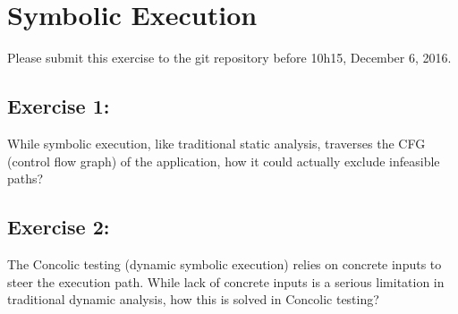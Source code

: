 \documentclass [11pt, a4wide, twoside]{article}
\begin{document}
\section*{Symbolic Execution}


Please submit this exercise to the git repository before 10h15, December 6, 2016.

\subsection*{Exercise 1:}
While symbolic execution, like traditional static analysis, traverses the CFG (control flow graph) of the application, how it could actually exclude infeasible paths?

\subsection*{Exercise 2:}
The Concolic testing (dynamic symbolic execution) relies on concrete inputs to steer the execution path. While lack of concrete inputs is a serious limitation in traditional dynamic analysis, how this is solved in Concolic testing?
\end{document}
